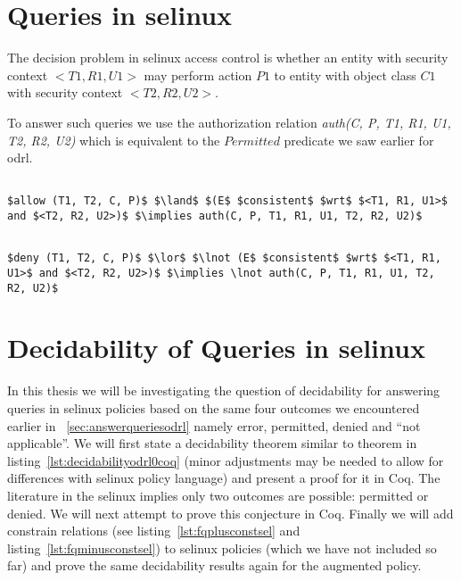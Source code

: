 \section{Queries in \ac{selinux}}

The decision problem in \ac{selinux} access control is whether an entity with security context $<T1, R1, U1>$ may perform action $P1$ to entity with object class $C1$ with security context $<T2, R2, U2>$.

To answer such queries we use the authorization relation \emph{auth(C, P, T1, R1, U1, T2, R2, U2)} which is equivalent to the $Permitted$ predicate we saw earlier for \ac{odrl}.

\lstset{mathescape, language=AST} 
\begin{lstlisting}[frame=single, caption={$f^{+}_q$ for \ac{selinux}},label={lst:fqplussel}]

$allow (T1, T2, C, P)$ $\land$ $(E$ $consistent$ $wrt$ $<T1, R1, U1>$ and $<T2, R2, U2>)$ $\implies auth(C, P, T1, R1, U1, T2, R2, U2)$ 

\end{lstlisting}

\lstset{mathescape, language=AST} 
\begin{lstlisting}[frame=single, caption={$f^{-}_q$ for \ac{selinux}},label={lst:fqminussel}]

$deny (T1, T2, C, P)$ $\lor$ $\lnot (E$ $consistent$ $wrt$ $<T1, R1, U1>$ and $<T2, R2, U2>)$ $\implies \lnot auth(C, P, T1, R1, U1, T2, R2, U2)$ 

\end{lstlisting}

\section{Decidability of Queries in \ac{selinux}}

In this thesis we will be investigating the question of decidability for answering queries in \ac{selinux} policies based on the same four outcomes we encountered earlier in ~\ref{sec:answerqueriesodrl} namely error, permitted, denied and ``not applicable''. We will first state a decidability theorem similar to theorem in listing~\ref{lst:decidabilityodrl0coq} (minor adjustments may be needed to allow for differences with \ac{selinux} policy language) and present a proof for it in Coq. The literature in the \ac{selinux} implies only two outcomes are possible: permitted or denied. We will next attempt to prove this conjecture in Coq. Finally we will add constrain relations (see listing~\ref{lst:fqplusconstsel} and listing~\ref{lst:fqminusconstsel}) to \ac{selinux} policies (which we have not included so far) and prove the same decidability results again for the augmented policy.

